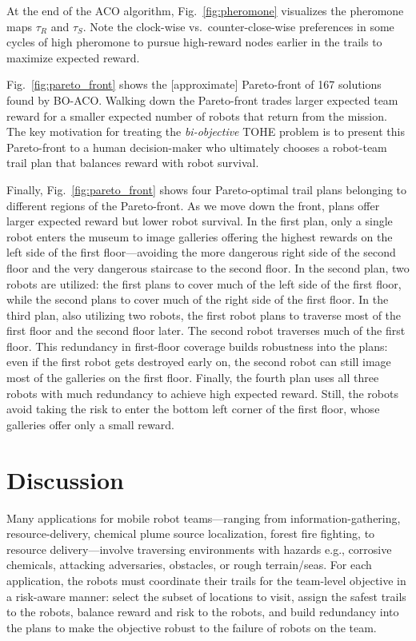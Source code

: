 \documentclass[11pt, oneside]{article}
\begin{document}
At the end of the ACO algorithm, Fig.~\ref{fig:pheromone} visualizes the pheromone maps $\tau_{R}$ and $\tau_S$.
 Note the clock-wise vs.\ counter-close-wise preferences in some cycles of high pheromone to pursue high-reward nodes earlier in the trails to maximize expected reward.
 
 

Fig.~\ref{fig:pareto_front} shows the [approximate] Pareto-front of 167 solutions found by BO-ACO. 
Walking down the Pareto-front trades larger expected team reward for a smaller expected number of robots that return from the mission. The key motivation for treating the \emph{bi-objective} TOHE problem is to present this Pareto-front to a human decision-maker who ultimately chooses a robot-team trail plan that balances reward with robot survival.

Finally, Fig.~\ref{fig:pareto_front} shows four Pareto-optimal trail plans belonging to different regions of the Pareto-front. 
As we move down the front, plans offer larger expected reward but lower robot survival.
In the first plan, only a single robot enters the museum to image galleries offering the highest rewards on the left side of the first floor---avoiding the more dangerous right side of the second floor and the very dangerous staircase to the second floor. 
In the second plan, two robots are utilized: the first plans to cover much of the left side of the first floor, while the second plans to cover much of the right side of the first floor.
In the third plan, also utilizing two robots, the first robot plans to traverse most of the first floor and the second floor later. The second robot traverses much of the first floor. This redundancy in first-floor coverage builds robustness into the plans: even if the first robot gets destroyed early on, the second robot can still image most of the galleries on the first floor.
Finally, the fourth plan uses all three robots with much redundancy to achieve high expected reward. Still, the robots avoid taking the risk to enter the bottom left corner of the first floor, whose galleries offer only a small reward.


\section{Discussion}
Many applications for mobile robot teams---ranging from information-gathering, resource-delivery, chemical plume source localization, forest fire fighting, to resource delivery---involve traversing environments with hazards e.g., corrosive chemicals, attacking adversaries, obstacles, or rough terrain/seas. 
For each application, the robots must coordinate their trails for the team-level objective in a risk-aware manner: select the subset of locations to visit, assign the safest trails to the robots, balance reward and risk to the robots, and build redundancy into the plans to make the objective robust to the failure of robots on the team. 
\end{document}

